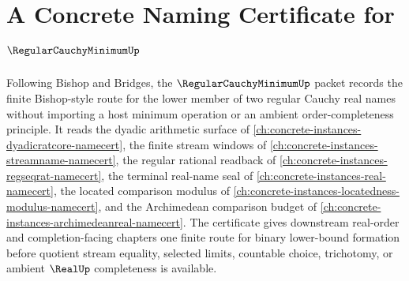 \chapter{A Concrete Naming Certificate for $\RegularCauchyMinimumUp$}
\label{ch:concrete-instances-regular-cauchy-minimum-namecert}

Following Bishop and Bridges, the $\RegularCauchyMinimumUp$ packet records the finite Bishop-style route for the lower member of two regular Cauchy real names without importing a host minimum operation or an ambient order-completeness principle. It reads the dyadic arithmetic surface of \autoref{ch:concrete-instances-dyadicratcore-namecert}, the finite stream windows of \autoref{ch:concrete-instances-streamname-namecert}, the regular rational readback of \autoref{ch:concrete-instances-regseqrat-namecert}, the terminal real-name seal of \autoref{ch:concrete-instances-real-namecert}, the located comparison modulus of \autoref{ch:concrete-instances-locatedness-modulus-namecert}, and the Archimedean comparison budget of \autoref{ch:concrete-instances-archimedeanreal-namecert}. The certificate gives downstream real-order and completion-facing chapters one finite route for binary lower-bound formation before quotient stream equality, selected limits, countable choice, trichotomy, or ambient $\RealUp$ completeness is available.

